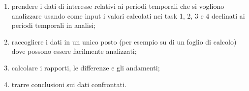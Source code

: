 \begin{enumerate}[resume]
    \begin{enumerate}[label=\alph*]
        \item prendere i dati di interesse relativi ai periodi temporali che si vogliono analizzare usando come input i valori calcolati nei task 1, 2, 3 e 4 declinati ai periodi temporali in analisi;
        \item raccogliere i dati in un unico posto (per esempio su di un foglio di calcolo) dove possono essere facilmente analizzati;
        \item calcolare i rapporti, le differenze e gli andamenti;
        \item trarre conclusioni sui dati confrontati.
    \end{enumerate}
\end{enumerate}